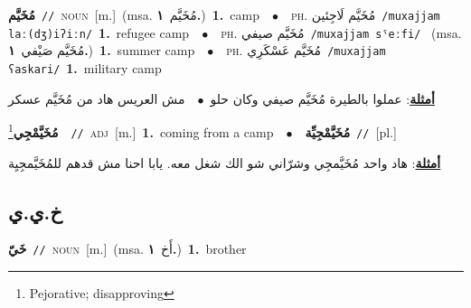 \documentclass[10pt,a4paper,twoside]{article} %
\begin{document}
\begin{multicols}{2}
{\setlength\topsep{0pt}\textbf{\foreignlanguage{arabic}{مُخَيَّم}}\ {\color{gray}\texttt{//}\color{black}}\ \textsc{noun}\ [m.]\ \color{gray}(msa. \foreignlanguage{arabic}{مُخَيَّم}~\foreignlanguage{arabic}{\textbf{١.}})\color{black}\ \textbf{1.}~camp\ \ $\bullet$\ \ \textsc{ph.} \color{gray} \foreignlanguage{arabic}{مُخَيَّم لَاجِئين}\color{black}\ {\color{gray}\texttt{/{\sffamily muxajjam laː(dʒ)iʔiːn}/}\color{black}}\ \textbf{1.}~refugee camp\ \ $\bullet$\ \ \textsc{ph.} \color{gray} \foreignlanguage{arabic}{مُخَيَّم صيفي}\color{black}\ {\color{gray}\texttt{/{\sffamily muxajjam sˤeːfi}/}\color{black}}\ \color{gray} (msa. \foreignlanguage{arabic}{مُخَيَّم صَيْفي}~\foreignlanguage{arabic}{\textbf{١.}})\color{black}\ \textbf{1.}~summer camp\ \ $\bullet$\ \ \textsc{ph.} \color{gray} \foreignlanguage{arabic}{مُخَيَّم عَسْكَرِي}\color{black}\ {\color{gray}\texttt{/{\sffamily muxajjam ʕaskari}/}\color{black}}\ \textbf{1.}~military camp\  \begin{flushright}\color{gray}\foreignlanguage{arabic}{\textbf{\underline{\foreignlanguage{arabic}{أمثلة}}}: عملوا بالطيرة مُخَيَّم صيفي وكان حلو\ $\bullet$\ \  مش العريس هاد من مُخَيَّم عسكر}\end{flushright}\color{black}} \vspace{2mm}

{\setlength\topsep{0pt}\textbf{\foreignlanguage{arabic}{مُخَيَّمْجِي}}\footnote{Pejorative; disapproving}\ \ {\color{gray}\texttt{//}\color{black}}\ \textsc{adj}\ [m.]\ \textbf{1.}~coming from a camp\ \ $\bullet$\ \ \setlength\topsep{0pt}\textbf{\foreignlanguage{arabic}{مُخَيَّمْجِيِّة}}\ {\color{gray}\texttt{//}\color{black}}\ [pl.]\  \begin{flushright}\color{gray}\foreignlanguage{arabic}{\textbf{\underline{\foreignlanguage{arabic}{أمثلة}}}: هاد واحد مُخَيَّمجِي وشرّاني شو الك شغل معه. يابا احنا مش قدهم للمُخَيَّمجِيِة}\end{flushright}\color{black}} \vspace{2mm}

\vspace{-3mm}
\subsection*{\color{blue}\foreignlanguage{arabic}{خ.ي.ي}\color{blue}{}} 

{\setlength\topsep{0pt}\textbf{\foreignlanguage{arabic}{خَيّ}}\ {\color{gray}\texttt{//}\color{black}}\ \textsc{noun}\ [m.]\ \color{gray}(msa. \foreignlanguage{arabic}{أَخ}~\foreignlanguage{arabic}{\textbf{١.}})\color{black}\ \textbf{1.}~brother\ } \vspace{2mm}

\end{multicols}
\end{document}
